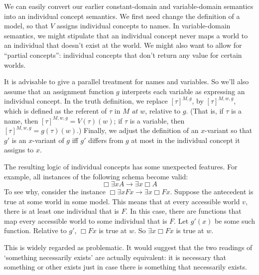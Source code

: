 We can easily convert our earlier constant-domain and variable-domain semantics
into an individual concept semantics. We first need change the definition of a
model, so that $V$ assigns individual concepts to names. In variable-domain
semantics, we might stipulate that an individual concept never maps a world to
an individual that doesn't exist at the world. We might also want to allow for
``partial concepts'': individual concepts that don't return any value for
certain worlds.

It is advisable to give a parallel treatment for names and variables. So we'll
also assume that an assignment function $g$ interprets each variable as
expressing an individual concept. In the truth definition, we replace
$[\tau]^{M,g}$, by $[\tau]^{M,w,g}$, which is defined as the referent of $\tau$
in $M$ \emph{at $w$}, relative to $g$. (That is, if $\tau$ is a name, then
$[\tau]^{M,w,g} = V(\tau)(w)$; if $\tau$ is a variable, then
$[\tau]^{M,w,g} = g(\tau)(w)$.) Finally, we adjust the definition of an
$x$-variant so that $g'$ is an $x$-variant of $g$ iff $g'$ differs from $g$ at
most in the individual concept it assigns to $x$.

The resulting logic of individual concepts has some unexpected features. For
example, all instances of the following schema become valid:
\[
  \Box \exists x A \to \exists x \Box A
\]
To see why, consider the instance $\Box \exists x Fx \to \exists x \Box Fx$.
Suppose the antecedent is true at some world in some model. This means that at
every accessible world $v$, there is at least one individual that is $F$. In
this case, there are functions that map every accessible world to some
individual that is $F$. Let $g'(x)$ be some such function. Relative to $g'$,
$\Box Fx$ is true at $w$. So $\exists x \Box Fx$ is true at $w$.

This is widely regarded as problematic. It would suggest that the two readings
of `something necessarily exists' are actually equivalent: it is necessary that
something or other exists just in case there is something that necessarily
exists.


